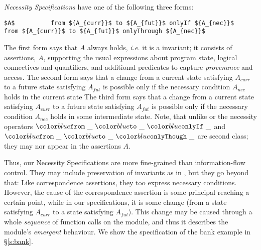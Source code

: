 \textit{Necessity Specifications}   have one of the following three forms:
%
%
%
%
\begin{lstlisting}[mathescape=true, language=chainmail, frame=lines]
       $A$          from ${A_{curr}}$ to ${A_{fut}}$ onlyIf ${A_{nec}}$          from ${A_{curr}}$ to ${A_{fut}}$ onlyThrough ${A_{nec}}$
\end{lstlisting}
%
The first form says that $A$ always holds, \textit{i.e.} it is a invariant; 
it consists of assertions,  $A$, supporting the usual expressions about program state,
  logical connectives and quantifiers, 
 and additional predicates
 to capture \textit{provenance} and access.
The second form says that  a change from a current state satisfying $A_{curr}$ to a future
state satisfying $A_{fut}$ %
is possible only if the necessary condition
$A_{nec}$ holds in the current state
%
The third form says that a change from a current state satisfying $A_{curr}$ to a future
state satisfying $A_{fut}$  is possible only if the necessary condition
$A_{nec}$ holds in some intermediate state.
 Note, that unlike \citeauthor{VerX} or \citeauthor{FASE}
 the necessity operators $\onlyIf {\_} {\_} {\_}$  and $\onlyThrough {\_} {\_} {\_}$
 are second class; they may nor appear in the assertions $A$.

Thus, our Necessity Specifications are more fine-grained than information-flow control.
They may include preservation
of invariants as in \cite{ddd}, but they go beyond that:   
Like correspondence assertions, they too express necessary conditions.
However, the cause of the correspondence assertion is some principal reaching
a certain point, while in our specifications, it is some change (from a state
satisfying ${A_{curr}}$ to a state satisfying ${A_{fut}}$).
This change may be caused through  a whole \emph{sequence} of  function 
calls on the module, and thus it describes the module's \emph{emergent}
behaviour. 
We show the specification of the bank example in  \S\ref{s:bank}.


